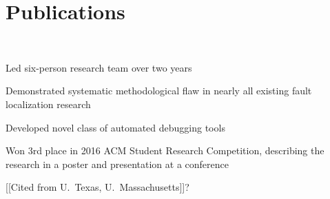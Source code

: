 \section{Publications}

 \\
\vspace{\topsep} %
\begin{tightemize}
\item Led six-person research team over two years
\item Demonstrated systematic methodological flaw in nearly all existing fault localization research
\item Developed novel class of automated debugging tools
\item Won 3rd place in 2016 ACM Student Research Competition, describing the research in a poster and presentation at a conference
\item {[[}Cited from U.~Texas, U.~Massachusetts{]]}?
\end{tightemize}
\sectionsep
